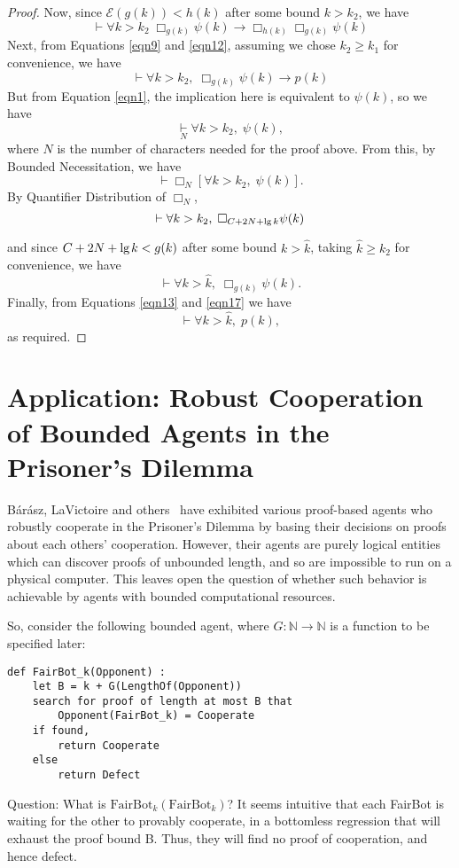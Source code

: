 \documentclass[onecolumn]{miri-tech-article}
\numberwithin{equation}{section}
\newcommand{\eqn}[1]{\begin{equation}#1\end{equation}}
\theoremstyle{definition}
\newcommand{\NN}{\mathbb{N}}
\newcommand{\Ee}{\mathcal{E}}
\newcommand{\proves}[1]{\underset{#1}{\vdash}}
\newcommand{\bx}[1]{\Box_{#1}}
\renewcommand{\implies}{\rightarrow}
\renewcommand{\to}{\rightarrow}
\renewcommand{\lg}{\mathrm{lg\hspace{0.3ex}}}
\renewcommand{\-}{^{-1}}
\newcommand{\FB}{\mathrm{FairBot}}
\begin{document}
\begin{proof}
Now, since $\Ee(g(k)) < h(k)$ after some bound $k>k_2$, we have
\eqn{\label{eqn12}
\proves{} \forall k > k_2 \; \bx{g(k)}\psi(k)\implies \bx{h(k)}\bx{g(k)}\psi(k)
}
Next, from Equations \ref{eqn9} and \ref{eqn12}, assuming we chose $k_2\geq k_1$ for convenience, we have
\eqn{\label{eqn13}
\proves{} \forall k>k_2,\; \bx{g(k)}\psi(k)\implies p(k)
}
But from Equation \ref{eqn1}, the implication here is equivalent to $\psi(k)$, so we have
$$ \proves{N} \forall k>k_2,\; \psi(k),$$
where $N$ is the number of characters needed for the proof above.  From this, by Bounded Necessitation, we have
$$\proves{} \bx{N} [\forall k>k_2,\; \psi(k)].$$
By Quantifier Distribution of $\bx{N}$,
$$\proves{} \forall k>k_2,\; \bx{C + 2N + \lg k} \psi(k)$$
and since $C + 2N + \lg k < g(k)$ after some bound $k>\hat k$, taking $\hat k \geq k_2$ for convenience, we have
\eqn{\label{eqn17}
\proves{}\forall k>\hat k,\; \bx{g(k)}\psi(k).
}
Finally, from Equations \ref{eqn13} and \ref{eqn17} we have
$$\proves{} \forall k>\hat k,\; p(k),$$
as required.
\end{proof}


\section{Application: Robust Cooperation of Bounded Agents in the Prisoner's Dilemma}

B\'{a}r\'{a}sz, LaVictoire and others~\cite{Barasz:2014:RobustCooperation}\cite{LaVictoire:2014:PrisDilemmaLob} have exhibited various proof-based agents who robustly cooperate in the Prisoner's Dilemma by basing their decisions on proofs about each others' cooperation.  However, their agents are purely logical entities which can discover proofs of unbounded length, and so are impossible to run on a physical computer.  This leaves open the question of whether such behavior is achievable by agents with bounded computational resources.

So, consider the following bounded agent, where $G:\NN\to\NN$ is a function to be specified later:

\begin{Verbatim}[frame=single]
def FairBot_k(Opponent) :
	let B = k + G(LengthOf(Opponent))
	search for proof of length at most B that 
		Opponent(FairBot_k) = Cooperate
	if found,
		return Cooperate
	else
		return Defect
\end{Verbatim}

Question: What is $\FB_k(\FB_k)$?  It seems intuitive that each FairBot is waiting for the other to provably cooperate, in a bottomless regression that will exhaust the proof bound B.  Thus, they will find no proof of cooperation, and hence defect.  
\end{document}
